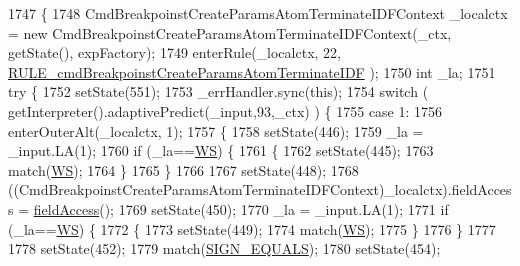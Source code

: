 \begin{DoxyCode}
1747                                                                                                            
                                                                 \{
1748     CmdBreakpoinstCreateParamsAtomTerminateIDFContext \_localctx = \textcolor{keyword}{new} 
      CmdBreakpoinstCreateParamsAtomTerminateIDFContext(\_ctx, getState(), expFactory);
1749     enterRule(\_localctx, 22, \hyperlink{classgov_1_1nasa_1_1jpf_1_1inspector_1_1server_1_1expression_1_1parser_1_1_expression_grammar_parser_aa362e794e1e6f828f242ad134cb08a18}{RULE\_cmdBreakpoinstCreateParamsAtomTerminateIDF}
      );
1750     \textcolor{keywordtype}{int} \_la;
1751     \textcolor{keywordflow}{try} \{
1752       setState(551);
1753       \_errHandler.sync(\textcolor{keyword}{this});
1754       \textcolor{keywordflow}{switch} ( getInterpreter().adaptivePredict(\_input,93,\_ctx) ) \{
1755       \textcolor{keywordflow}{case} 1:
1756         enterOuterAlt(\_localctx, 1);
1757         \{
1758         setState(446);
1759         \_la = \_input.LA(1);
1760         \textcolor{keywordflow}{if} (\_la==\hyperlink{classgov_1_1nasa_1_1jpf_1_1inspector_1_1server_1_1expression_1_1parser_1_1_expression_grammar_parser_ace44714ae633c7b14794cc5a24d9ebf3}{WS}) \{
1761           \{
1762           setState(445);
1763           match(\hyperlink{classgov_1_1nasa_1_1jpf_1_1inspector_1_1server_1_1expression_1_1parser_1_1_expression_grammar_parser_ace44714ae633c7b14794cc5a24d9ebf3}{WS});
1764           \}
1765         \}
1766 
1767         setState(448);
1768         ((CmdBreakpoinstCreateParamsAtomTerminateIDFContext)\_localctx).fieldAccess = 
      \hyperlink{classgov_1_1nasa_1_1jpf_1_1inspector_1_1server_1_1expression_1_1parser_1_1_expression_grammar_parser_ab65b047e852d9f4863e316728b4e791a}{fieldAccess}();
1769         setState(450);
1770         \_la = \_input.LA(1);
1771         \textcolor{keywordflow}{if} (\_la==\hyperlink{classgov_1_1nasa_1_1jpf_1_1inspector_1_1server_1_1expression_1_1parser_1_1_expression_grammar_parser_ace44714ae633c7b14794cc5a24d9ebf3}{WS}) \{
1772           \{
1773           setState(449);
1774           match(\hyperlink{classgov_1_1nasa_1_1jpf_1_1inspector_1_1server_1_1expression_1_1parser_1_1_expression_grammar_parser_ace44714ae633c7b14794cc5a24d9ebf3}{WS});
1775           \}
1776         \}
1777 
1778         setState(452);
1779         match(\hyperlink{classgov_1_1nasa_1_1jpf_1_1inspector_1_1server_1_1expression_1_1parser_1_1_expression_grammar_parser_a4dc93cc6563a32e75e7006cb71acb7b7}{SIGN\_EQUALS});
1780         setState(454);

\end{DoxyCode}
